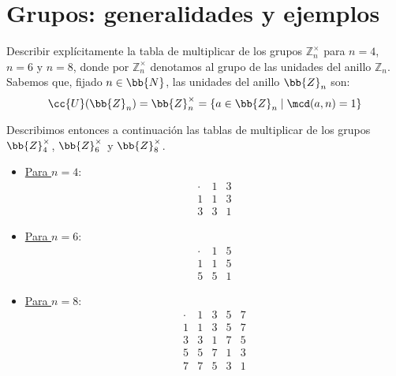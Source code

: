 \section{Grupos: generalidades y ejemplos}

\begin{ejercicio}\label{ej:2.1}
    Describir explícitamente la tabla de multiplicar de los grupos $\mathbb{Z}^{\times}_n$ para $n = 4$, $n = 6$ y $n = 8$, donde por $\mathbb{Z}^{\times}_n$ denotamos al grupo de las unidades del anillo $\mathbb{Z}_n$.\\

    Sabemos que, fijado $n\in \bb{N}$, las unidades del anillo $\bb{Z}_n$ son:
    \[
        \cc{U}(\bb{Z}_n) = \bb{Z}^{\times}_n = \{a\in \bb{Z}_n \mid \mcd(a,n) = 1\}
    \]

    Describimos entonces a continuación las tablas de multiplicar de los grupos $\bb{Z}^{\times}_4$, $\bb{Z}^{\times}_6$ y $\bb{Z}^{\times}_8$.
    \begin{itemize}
        \item \ul{Para $n = 4$}:
        \begin{equation*}
            \begin{array}{c|cc}
                \cdot & 1 & 3 \\
                \hline
                1 & 1 & 3 \\
                3 & 3 & 1
            \end{array}
        \end{equation*}

        \item \ul{Para $n = 6$}:
        \begin{equation*}
            \begin{array}{c|cc}
                \cdot & 1 & 5 \\ \hline
                1 & 1 & 5 \\
                5 & 5 & 1
            \end{array}
        \end{equation*}

        \item \ul{Para $n = 8$}:
        \begin{equation*}
            \begin{array}{c|cccc}
                \cdot & 1 & 3 & 5 & 7 \\ \hline
                1 & 1 & 3 & 5 & 7 \\
                3 & 3 & 1 & 7 & 5 \\
                5 & 5 & 7 & 1 & 3 \\
                7 & 7 & 5 & 3 & 1
            \end{array}
        \end{equation*}
    \end{itemize}

\end{ejercicio}

